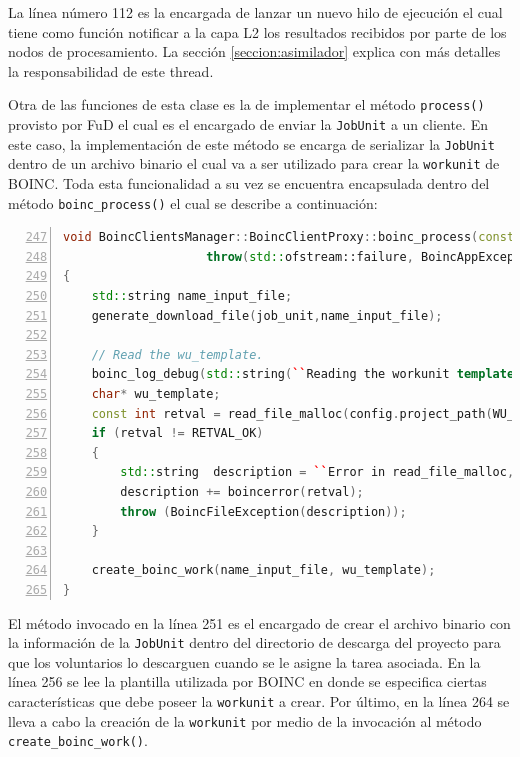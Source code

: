 La línea número 112 es la encargada de lanzar un nuevo hilo de ejecución el cual tiene como función notificar a la capa L2 los resultados recibidos por parte de los nodos de procesamiento. La sección \ref{seccion:asimilador} explica con más detalles la responsabilidad de este thread.

Otra de las funciones de esta clase es la de implementar el método \texttt{process()} provisto por FuD el cual es el encargado de enviar la \texttt{JobUnit} a un cliente. En este caso, la implementación de este método se encarga de serializar la \texttt{JobUnit} dentro de un archivo binario el cual va a ser utilizado para crear la \texttt{workunit} de BOINC. Toda esta funcionalidad a su vez se encuentra encapsulada dentro del método \texttt{boinc\_process()} el cual se describe a continuación:

\begin{lstlisting}[frame=shadowbox, language=C++, numbers=left, xleftmargin=8mm, framexleftmargin=22pt, basicstyle=\scriptsize, numberstyle=\footnotesize, breaklines=true, breakatwhitespace=false, captionpos=b, caption={Método \texttt{boinc\_process()} de \texttt{BoincClientProxy}}, label=listing:BoincClientProxy:boinc:process, backgroundcolor=\color{gris}, firstnumber=247, keywordstyle=\color{Blue}]
void BoincClientsManager::BoincClientProxy::boinc_process(const JobUnit& job_unit) 
                    throw(std::ofstream::failure, BoincAppException, BoincFileException, BoincWorkException )
{
    std::string name_input_file;
    generate_download_file(job_unit,name_input_file);

    // Read the wu_template.
    boinc_log_debug(std::string(``Reading the workunit template file''));
    char* wu_template;
    const int retval = read_file_malloc(config.project_path(WU_TEMPLATE.c_str()), wu_template);
    if (retval != RETVAL_OK)
    {
        std::string  description = ``Error in read_file_malloc, '';
        description += boincerror(retval);
        throw (BoincFileException(description));
    }

    create_boinc_work(name_input_file, wu_template);
}
\end{lstlisting}

El método invocado en la línea 251 es el encargado de crear el archivo binario con la información de la \texttt{JobUnit} dentro del directorio de descarga del proyecto para que los voluntarios lo descarguen cuando se le asigne la tarea asociada. En la línea 256 se lee la plantilla utilizada por BOINC en donde se especifica ciertas características que debe poseer la \texttt{workunit} a crear. Por último, en la línea 264 se lleva a cabo la creación de la \texttt{workunit} por medio de la invocación al método \texttt{create\_boinc\_work()}.

